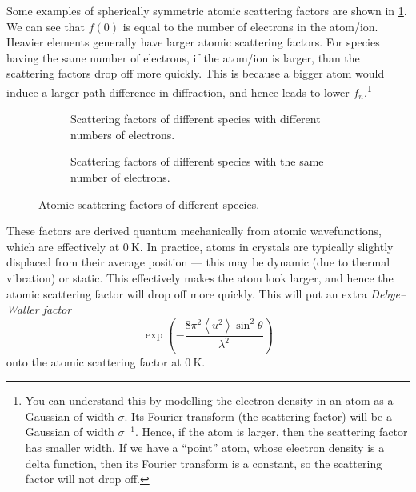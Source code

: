\documentclass{article}
\theoremstyle{plain}\theoremheaderfont{\normalfont\itshape}\theorembodyfont{\rmfamily}\theoremseparator{.}\newtheorem*{rem}{Remark}\newtheorem*{ex}{Example}\newtheorem*{proof}{Proof}\newtheorem*{altp}{Alternative proof}
\theoremstyle{plain}\theoremheaderfont{\normalfont\bfseries}\theorembodyfont{\rmfamily}\theoremseparator{.}\newtheorem{thm}{Theorem}[section]\newtheorem{lem}[thm]{Lemma}\newtheorem{prop}[thm]{Proposition}\newtheorem*{cor}{Corollary}\newtheorem{defn}[thm]{Definition}\newtheorem{clm}[thm]{Claim}\newtheorem{clminproof}{Claim}\newtheorem*{law}{Law}\newtheorem{pos}[thm]{Postulate}
\theoremstyle{break}\theoremheaderfont{\normalfont\itshape}\theorembodyfont{\rmfamily}\theoremseparator{.\medskip}\newtheorem*{proofskip}{Proof}\newtheorem*{exs}{Examples}\newtheorem*{rems}{Remarks}
\theoremstyle{break}\theoremheaderfont{\normalfont\bfseries}\theorembodyfont{\rmfamily}\theoremseparator{.\medskip}\newtheorem{lemskip}[thm]{Lemma}\newtheorem{defnskip}[thm]{Definition}\newtheorem{propskip}[thm]{Proposition}\newtheorem{thmskip}[thm]{Theorem}
\numberwithin{equation}{section}
\newcommand{\unit}[1]{\ \mathrm{#1}}
\newcommand{\eval}[1]{\left\langle #1 \right\rangle}
\begin{document}
    Some examples of spherically symmetric atomic scattering factors are shown in \cref{Fig:scattering_factor}. We can see that \(f(0)\) is equal to the number of electrons in the atom/ion. Heavier elements generally have larger atomic scattering factors. For species having the same number of electrons, if the atom/ion is larger, than the scattering factors drop off more quickly. This is because a bigger atom would induce a larger path difference in diffraction, and hence leads to lower \(f_n\).\footnote{You can understand this by modelling the electron density in an atom as a Gaussian of width \(\sigma\). Its Fourier transform (the scattering factor) will be a Gaussian of width \(\sigma^{-1}\). Hence, if the atom is larger, then the scattering factor has smaller width. If we have a ``point'' atom, whose electron density is a delta function, then its Fourier transform is a constant, so the scattering factor will not drop off.}
    \begin{figure}
        \centering
        \begin{subfigure}[h]{0.45\linewidth}
            \begin{adjustbox}{width=\linewidth}
                
            \end{adjustbox}
            \caption{Scattering factors of different species with different numbers of electrons.}
        \end{subfigure}
        \hfill
        \begin{subfigure}[h]{0.45\linewidth}
            \begin{adjustbox}{width=\linewidth}
                
            \end{adjustbox}
            \caption{Scattering factors of different species with the same number of electrons.}
        \end{subfigure}
        \caption{Atomic scattering factors of different species.}
        \label{Fig:scattering_factor}
    \end{figure}

    These factors are derived quantum mechanically from atomic wavefunctions, which are effectively at \(0\unit{K}\). In practice, atoms in crystals are typically slightly displaced from their average position --- this may be dynamic (due to thermal vibration) or static. This effectively makes the atom look larger, and hence the atomic scattering factor will drop off more quickly. This will put an extra \textit{Debye--Waller factor}
    \begin{equation}
        \exp\left(-\frac{8\pi^2\eval{u^2}\sin^2\theta}{\lambda^2}\right)
    \end{equation}
    onto the atomic scattering factor at \(0\unit{K}\).
\end{document}

